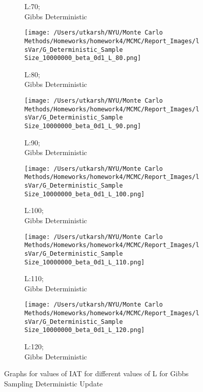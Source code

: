 \documentclass[11pt]{article}
\begin{document}
\begin{figure}[H]
\begin{subfigure}{.20\textwidth}
		\caption{L:70;\\Gibbs Deterministic}
	\end{subfigure}
	\begin{subfigure}{.20\textwidth}
		\texttt{[image: /Users/utkarsh/NYU/Monte Carlo Methods/Homeworks/homework4/MCMC/Report\_Images/lsVar/G\_Deterministic\_Sample Size\_10000000\_beta\_0d1\_L\_80.png]}
		\caption{L:80;\\Gibbs Deterministic}
	\end{subfigure}
	\begin{subfigure}{.20\textwidth}
		\texttt{[image: /Users/utkarsh/NYU/Monte Carlo Methods/Homeworks/homework4/MCMC/Report\_Images/lsVar/G\_Deterministic\_Sample Size\_10000000\_beta\_0d1\_L\_90.png]}
		\caption{L:90;\\Gibbs Deterministic}
	\end{subfigure}
	\begin{subfigure}{.20\textwidth}
		\texttt{[image: /Users/utkarsh/NYU/Monte Carlo Methods/Homeworks/homework4/MCMC/Report\_Images/lsVar/G\_Deterministic\_Sample Size\_10000000\_beta\_0d1\_L\_100.png]}
		\caption{L:100;\\Gibbs Deterministic}
	\end{subfigure}
	\begin{subfigure}{.20\textwidth}
		\texttt{[image: /Users/utkarsh/NYU/Monte Carlo Methods/Homeworks/homework4/MCMC/Report\_Images/lsVar/G\_Deterministic\_Sample Size\_10000000\_beta\_0d1\_L\_110.png]}
		\caption{L:110;\\Gibbs Deterministic}
	\end{subfigure}
	\begin{subfigure}{.20\textwidth}
		\texttt{[image: /Users/utkarsh/NYU/Monte Carlo Methods/Homeworks/homework4/MCMC/Report\_Images/lsVar/G\_Deterministic\_Sample Size\_10000000\_beta\_0d1\_L\_120.png]}
		\caption{L:120;\\Gibbs Deterministic}
	\end{subfigure}
    \caption{Graphs for values of IAT for different values of L for Gibbs Sampling Deterministic Update}
	\label{fig:iat_ls_gibbs_deterministic}
\end{figure}

\end{document}
